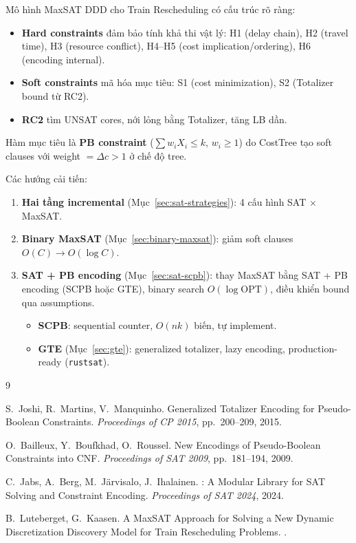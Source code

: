 \documentclass[11pt,a4paper]{article}
\begin{document}
Mô hình MaxSAT DDD cho Train Rescheduling có cấu trúc rõ ràng:

\begin{itemize}
  \item \textbf{Hard constraints} đảm bảo tính khả thi vật lý: H1 (delay chain), H2 (travel time), H3 (resource conflict), H4--H5 (cost implication/ordering), H6 (encoding internal).

  \item \textbf{Soft constraints} mã hóa mục tiêu: S1 (cost minimization), S2 (Totalizer bound từ RC2).

  \item \textbf{RC2} tìm UNSAT cores, nới lỏng bằng Totalizer, tăng LB dần.
\end{itemize}

Hàm mục tiêu là \textbf{PB constraint} ($\sum w_i X_i \leq k$, $w_i \geq 1$) do CostTree tạo soft clauses với weight $= \Delta c > 1$ ở chế độ tree.

Các hướng cải tiến:
\begin{enumerate}
  \item \textbf{Hai tầng incremental} (Mục~\ref{sec:sat-strategies}): 4 cấu hình SAT $\times$ MaxSAT.
  \item \textbf{Binary MaxSAT} (Mục~\ref{sec:binary-maxsat}): giảm soft clauses $O(C) \to O(\log C)$.
  \item \textbf{SAT + PB encoding} (Mục~\ref{sec:sat-scpb}): thay MaxSAT bằng SAT + PB encoding (SCPB hoặc GTE), binary search $O(\log \text{OPT})$, điều khiển bound qua assumptions.
  \begin{itemize}
    \item \textbf{SCPB}: sequential counter, $O(nk)$ biến, tự implement.
    \item \textbf{GTE} (Mục~\ref{sec:gte}): generalized totalizer, lazy encoding, production-ready (\texttt{rustsat}).
  \end{itemize}
\end{enumerate}

\begin{thebibliography}{9}

S.~Joshi, R.~Martins, V.~Manquinho.
\newblock Generalized Totalizer Encoding for Pseudo-Boolean Constraints.
\newblock \emph{Proceedings of CP 2015}, pp.~200--209, 2015.

O.~Bailleux, Y.~Boufkhad, O.~Roussel.
\newblock New Encodings of Pseudo-Boolean Constraints into CNF.
\newblock \emph{Proceedings of SAT 2009}, pp.~181--194, 2009.

C.~Jabs, A.~Berg, M.~Järvisalo, J.~Ihalainen.
: A Modular Library for SAT Solving and Constraint Encoding.
\newblock \emph{Proceedings of SAT 2024}, 2024.

B.~Luteberget, G.~Kaasen.
\newblock A MaxSAT Approach for Solving a New Dynamic Discretization Discovery Model for Train Rescheduling Problems.
.

\end{thebibliography}
\end{document}
